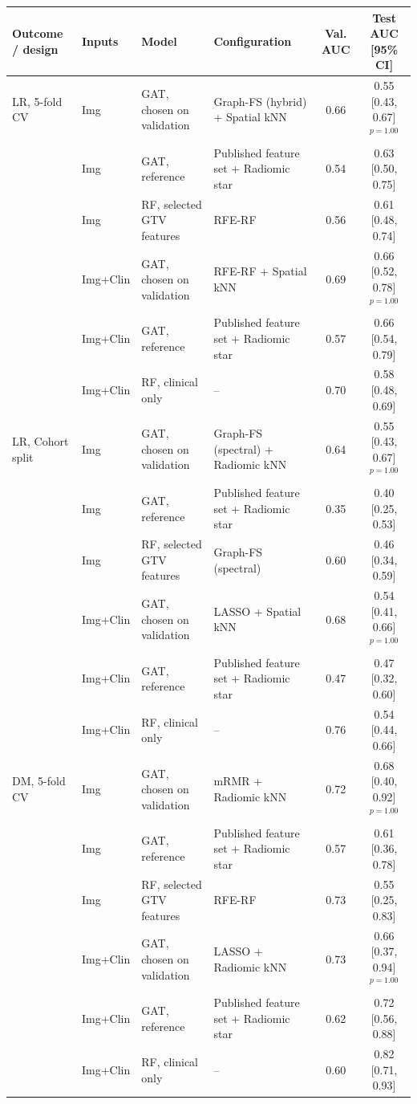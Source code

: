 \begin{tabular}{@{}llllcc@{}}
\toprule
Outcome / design & Inputs & Model & Configuration & Val. AUC & Test AUC [95\% CI] \\
\midrule
LR, 5-fold CV & Img & GAT, chosen on validation & Graph-FS (hybrid) + Spatial kNN & 0.66 & 0.55 [0.43, 0.67]$^{p=1.00}$ \\
 & Img & GAT, reference & Published feature set + Radiomic star & 0.54 & 0.63 [0.50, 0.75] \\
 & Img & RF, selected GTV features & RFE-RF & 0.56 & 0.61 [0.48, 0.74] \\
 & Img+Clin & GAT, chosen on validation & RFE-RF + Spatial kNN & 0.69 & 0.66 [0.52, 0.78]$^{p=1.00}$ \\
 & Img+Clin & GAT, reference & Published feature set + Radiomic star & 0.57 & 0.66 [0.54, 0.79] \\
 & Img+Clin & RF, clinical only & -- & 0.70 & 0.58 [0.48, 0.69] \\
\addlinespace
LR, Cohort split & Img & GAT, chosen on validation & Graph-FS (spectral) + Radiomic kNN & 0.64 & 0.55 [0.43, 0.67]$^{p=1.00}$ \\
 & Img & GAT, reference & Published feature set + Radiomic star & 0.35 & 0.40 [0.25, 0.53] \\
 & Img & RF, selected GTV features & Graph-FS (spectral) & 0.60 & 0.46 [0.34, 0.59] \\
 & Img+Clin & GAT, chosen on validation & LASSO + Spatial kNN & 0.68 & 0.54 [0.41, 0.66]$^{p=1.00}$ \\
 & Img+Clin & GAT, reference & Published feature set + Radiomic star & 0.47 & 0.47 [0.32, 0.60] \\
 & Img+Clin & RF, clinical only & -- & 0.76 & 0.54 [0.44, 0.66] \\
\midrule
DM, 5-fold CV & Img & GAT, chosen on validation & mRMR + Radiomic kNN & 0.72 & 0.68 [0.40, 0.92]$^{p=1.00}$ \\
 & Img & GAT, reference & Published feature set + Radiomic star & 0.57 & 0.61 [0.36, 0.78] \\
 & Img & RF, selected GTV features & RFE-RF & 0.73 & 0.55 [0.25, 0.83] \\
 & Img+Clin & GAT, chosen on validation & LASSO + Radiomic kNN & 0.73 & 0.66 [0.37, 0.94]$^{p=1.00}$ \\
 & Img+Clin & GAT, reference & Published feature set + Radiomic star & 0.62 & 0.72 [0.56, 0.88] \\
 & Img+Clin & RF, clinical only & -- & 0.60 & 0.82 [0.71, 0.93] \\

\end{tabular}

